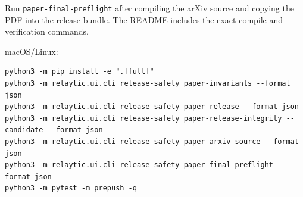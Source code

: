\documentclass[11pt]{article}
\begin{document}
Run \mbox{\nolinkurl{paper-final-preflight}} after compiling the arXiv source and copying the PDF into the release bundle. The README includes the exact compile and verification commands.

macOS/Linux:

\begin{Verbatim}[frame=single,framesep=6pt,fontsize=\footnotesize,breaklines=true,breakanywhere=true]
python3 -m pip install -e ".[full]"
python3 -m relaytic.ui.cli release-safety paper-invariants --format json
python3 -m relaytic.ui.cli release-safety paper-release --format json
python3 -m relaytic.ui.cli release-safety paper-release-integrity --candidate --format json
python3 -m relaytic.ui.cli release-safety paper-arxiv-source --format json
python3 -m relaytic.ui.cli release-safety paper-final-preflight --format json
python3 -m pytest -m prepush -q
\end{Verbatim}





\end{document}
